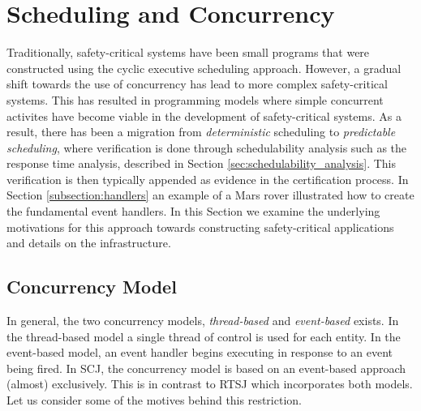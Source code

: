 \section{Scheduling and Concurrency}
\label{section:schedulingConcurrency}
Traditionally, safety-critical systems have been small programs that were constructed using the cyclic executive scheduling approach. However, a gradual shift towards the use of concurrency has lead to more complex safety-critical systems. This has resulted in programming models where simple concurrent activites have become viable in the development of safety-critical systems. As a result, there has been a migration from \textit{deterministic} scheduling to \textit{predictable scheduling}, where verification is done through schedulability analysis such as the response time analysis, described in Section \ref{sec:schedulability_analysis}. This verification is then typically appended as evidence in the certification process. In Section \ref{subsection:handlers} an example of a Mars rover illustrated how to create the fundamental event handlers. In this Section we examine the underlying motivations for this approach towards constructing safety-critical applications and details on the infrastructure.



\subsection{Concurrency Model} %
\label{sub:concurrency_model}
In general, the two concurrency models, \textit{thread-based} and \textit{event-based} exists. In the thread-based model a single thread of control is used for each entity. In the event-based model, an event handler begins executing in response to an event being fired. In SCJ, the concurrency model is based on an event-based approach (almost) exclusively. This is in contrast to RTSJ which incorporates both models. Let us consider some of the motives behind this restriction. 

